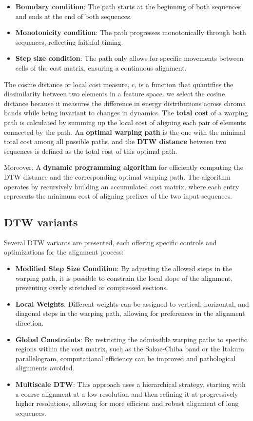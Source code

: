 \documentclass[a4paper, 9pt, twocolumn]{extarticle}
\begin{document}
\begin{itemize}
  \item
        \textbf{Boundary condition}: The path starts at the beginning of both
        sequences and ends at the end of both sequences.
  \item
        \textbf{Monotonicity condition}: The path progresses monotonically
        through both sequences, reflecting faithful timing.
  \item
        \textbf{Step size condition}: The path only allows for specific
        movements between cells of the cost matrix, ensuring a continuous
        alignment.
\end{itemize}
The cosine distance or local cost measure, c, is a function that quantifies the dissimilarity between two elements in a feature space. we select the cosine distance because it measures the difference in energy distributions across chroma bands while being invariant to changes in dynamics.
The \textbf{total cost} of a warping path is calculated by summing up
the local cost of aligning each pair of elements connected by the path.
An \textbf{optimal warping path} is the one with the minimal total cost
among all possible paths, and the \textbf{DTW distance} between two
sequences is defined as the total cost of this optimal path.

Moreover, A \textbf{dynamic programming algorithm} for efficiently
computing the DTW distance and the corresponding optimal warping path.
The algorithm operates by recursively building an accumulated cost
matrix, where each entry represents the minimum cost of aligning
prefixes of the two input sequences.
\subsection{DTW variants}
Several DTW variants are presented, each offering specific
controls and optimizations for the alignment process:
\begin{itemize}
  \item
        \textbf{Modified Step Size Condition}: By adjusting the allowed steps
        in the warping path, it is possible to constrain the local slope of
        the alignment, preventing overly stretched or compressed sections.
  \item
        \textbf{Local Weights}: Different weights can be assigned to vertical,
        horizontal, and diagonal steps in the warping path, allowing for
        preferences in the alignment direction.
  \item
        \textbf{Global Constraints}: By restricting the admissible warping
        paths to specific regions within the cost matrix, such as the
        Sakoe-Chiba band or the Itakura parallelogram, computational
        efficiency can be improved and pathological alignments avoided.
  \item
        \textbf{Multiscale DTW}: This approach uses a hierarchical strategy,
        starting with a coarse alignment at a low resolution and then refining
        it at progressively higher resolutions, allowing for more efficient
        and robust alignment of long sequences.
\end{itemize}
\end{document}
